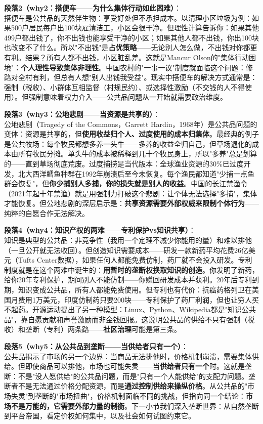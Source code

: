 \documentclass[../main.tex]{subfiles}
\begin{document}
	\textbf{段落2（why2：搭便车——为什么集体行动如此困难）}：\\
	搭便车是公共品的天然伴生物：享受好处但不承担成本。以清理小区垃圾为例：如果500户居民每户出100块雇清洁工，小区会很干净。但理性计算告诉你：如果其他499户都出钱了，你不出钱也能享受干净的小区；如果其他人都不出钱，你出100块也改变不了什么。所以"不出钱"是\textbf{占优策略}——无论别人怎么做，不出钱对你都更有利。结果？所有人都不出钱，小区脏乱差。这就是Mancur Olson的"集体行动困境"：\textbf{个人理性导致集体非理性}。中国农村的"一事一议"制度就面临这个问题：修路对全村有利，但总有人想"别人出钱我受益"。现实中搭便车的解决方式通常是：强制（税收）、小群体互相监督（村规民约）、或选择性激励（不交钱的人不得使用）。但强制意味着权力介入——公共品问题从一开始就需要政治维度。

	\textbf{段落3（why3：公地悲剧——当资源是共享的）}：\\
	公地悲剧（Tragedy of the Commons，Garrett Hardin，1968年）是公共品问题的变体：资源是共享的，但\textbf{使用收益归个人、过度使用的成本归集体}。最经典的例子是公共牧场：每个牧民都想多养一头牛——多养的收益全归自己，但草场退化的成本由所有牧民分摊。单头牛的成本被稀释到几十个牧民身上，所以"多养"总是划算的——直到草场彻底荒废。过度捕捞是当代版本：全球渔业资源的30\%已过度开发，北大西洋鳕鱼种群在1992年崩溃后至今未恢复。每个渔民都知道"少捕一点鱼群会恢复"，但\textbf{你少捕别人多捕，你的损失就是别人的收益}。中国的长江禁渔令（2021年起十年禁渔）就是用强制力打破这个悲剧：让个体无法选择"多捕"，集体才能恢复。但公地悲剧的深层启示是：\textbf{共享资源需要外部权威来限制个体行为}——纯粹的自愿合作无法解决。

	\textbf{段落4（why4：知识产权的两难——专利保护vs知识共享）}：\\
	知识是典型的公共品：非竞争性（我用一个定理不减少你能用的量）和难以排他（一旦公开就无法收回）。但创造知识需要成本——研发一款新药平均花费26亿美元（Tufts Center数据），如果任何人都能免费仿制，药厂就不会投入研发。专利制度就是在这个两难中诞生的：\textbf{用暂时的垄断权换取知识的创造}。你发明了新药，给你20年专利保护，期间别人不能仿制——你赚回研发成本并获利。20年后专利到期，知识变成公共品，所有人都能免费使用。但专利也有代价：抗癌药格列卫在美国月费用1万美元，印度仿制药只要200块——专利保护了药厂利润，但也让穷人买不起药。开源运动提出了另一种模型：Linux、Python、Wikipedia都是"知识公共品"，靠自愿贡献和声誉激励而非金钱回报。这说明公共品的供给不只有强制（税收）和垄断（专利）两条路——\textbf{社区治理}可能是第三条。

	\textbf{段落5（why5：从公共品到垄断——当供给者只有一个）}：\\
	公共品揭示了市场的另一个边界：当商品无法排他时，价格机制崩溃，需要集体供给。但即使商品可以排他，市场也可能失灵——当\textbf{供给者只有一个}时。这就是垄断：不是"没人愿供给"的公共品问题，而是"只有一个人能供给"的支配力问题。垄断者不是无法通过价格分配资源，而是\textbf{通过控制供给来操纵价格}。从公共品的"市场失灵"到垄断的"市场扭曲"，价格机制面临不同的挑战，但指向同一个结论：\textbf{市场不是万能的，它需要外部力量的制衡}。下一小节我们深入垄断世界：从自然垄断到平台帝国，看定价权如何集中，以及社会如何试图约束它。
\end{document}
